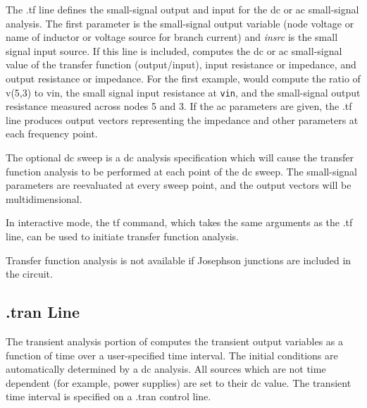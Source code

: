 The {\vt .tf} line defines the small-signal output and input for the
dc or ac small-signal analysis.  The first parameter is the
small-signal output variable (node voltage or name of inductor or
voltage source for branch current) and {\it insrc\/} is the small
signal input source.  If this line is included, {\WRspice} computes
the dc or ac small-signal value of the transfer function
(output/input), input resistance or impedance, and output resistance
or impedance.  For the first example, {\WRspice} would compute the
ratio of {\vt v(5,3)} to {\vt vin}, the small signal input resistance
at {\tt vin}, and the small-signal output resistance measured across
nodes 5 and 3.  If the ac parameters are given, the {\vt .tf} line
produces output vectors representing the impedance and other
parameters at each frequency point.

The optional dc sweep is a dc analysis specification which will cause
the transfer function analysis to be performed at each point of the dc
sweep.  The small-signal parameters are reevaluated at every sweep
point, and the output vectors will be multidimensional.

In interactive mode, the {\cb tf} command, which takes the same
arguments as the {\vt .tf} line, can be used to initiate transfer
function analysis.

Transfer function analysis is not available if Josephson junctions are
included in the circuit.

\subsection{{\vt .tran} Line}
\label{tranline}


The transient analysis portion of {\WRspice} computes the transient
output variables as a function of time over a user-specified time
interval.  The initial conditions are automatically determined by a dc
analysis.  All sources which are not time dependent (for example,
power supplies) are set to their dc value.  The transient time
interval is specified on a {\vt .tran} control line.


